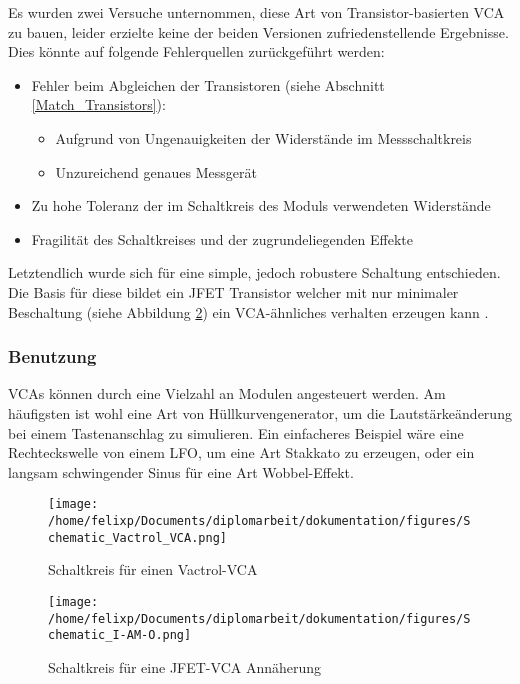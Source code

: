 \newpage

Es wurden zwei Versuche unternommen, diese Art von Transistor-basierten VCA \cite{klein:vca} zu bauen, leider erzielte keine der beiden Versionen zufriedenstellende Ergebnisse. Dies könnte auf folgende Fehlerquellen zurückgeführt werden:
\begin{itemize}
\item Fehler beim Abgleichen der Transistoren (siehe Abschnitt \ref{Match_Transistors}):
\begin{itemize}
\item Aufgrund von Ungenauigkeiten der Widerstände im Messschaltkreis
\item Unzureichend genaues Messgerät
\end{itemize}
\item Zu hohe Toleranz der im Schaltkreis des Moduls verwendeten Widerstände
\item Fragilität des Schaltkreises und der zugrundeliegenden Effekte
\end{itemize}

Letztendlich wurde sich für eine simple, jedoch robustere Schaltung entschieden. Die Basis für diese bildet ein JFET Transistor welcher mit nur minimaler Beschaltung (siehe Abbildung \ref{fig:orgc75b029}) ein \ac{VCA}-ähnliches verhalten erzeugen kann \cite{miaw:vcg}. 

\subsubsection{Benutzung}
\label{sec:org0ed4b0b}
\acp{VCA} können durch eine Vielzahl an Modulen angesteuert werden. Am häufigsten ist wohl eine Art von Hüllkurvengenerator, um die Lautstärkeänderung bei einem Tastenanschlag zu simulieren. Ein einfacheres Beispiel wäre eine Rechteckswelle von einem LFO, um eine Art Stakkato zu erzeugen, oder ein langsam schwingender Sinus für eine Art Wobbel-Effekt.

\begin{figure}[hp]
\centering
\texttt{[image: /home/felixp/Documents/diplomarbeit/dokumentation/figures/Schematic\_Vactrol\_VCA.png]}
\caption{\label{fig:org90b87a3}Schaltkreis für einen Vactrol-VCA \cite{miaw:vca}}
\end{figure}

\begin{figure}[hp]
\centering
\texttt{[image: /home/felixp/Documents/diplomarbeit/dokumentation/figures/Schematic\_I-AM-O.png]}
\caption{\label{fig:orgc75b029}Schaltkreis für eine JFET-VCA Annäherung}
\end{figure}

